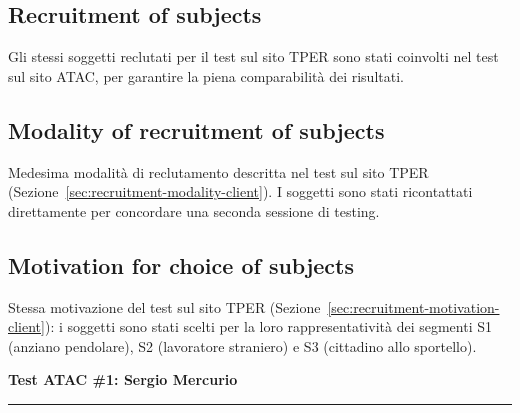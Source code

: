 ﻿\documentclass[11pt,a4paper]{article}
\begin{document}
\vspace{0.2cm}

\subsection*{Recruitment of subjects}
\begin{tcolorbox}[base]
Gli stessi soggetti reclutati per il test sul sito TPER
sono stati coinvolti nel test sul sito ATAC, per garantire
la piena comparabilità dei risultati.
\end{tcolorbox}

\vspace{0.2cm}

\subsection*{Modality of recruitment of subjects}
\begin{tcolorbox}[base]
Medesima modalità di reclutamento descritta nel test sul sito TPER
(Sezione~\ref{sec:recruitment-modality-client}). I soggetti sono
stati ricontattati direttamente per concordare una seconda sessione
di testing.
\end{tcolorbox}

\vspace{0.2cm}

\subsection*{Motivation for choice of subjects}
\begin{tcolorbox}[base]
Stessa motivazione del test sul sito TPER
(Sezione~\ref{sec:recruitment-motivation-client}): i soggetti
sono stati scelti per la loro rappresentatività dei segmenti
S1 (anziano pendolare), S2 (lavoratore straniero) e S3
(cittadino allo sportello).
\end{tcolorbox}


\newpage
\begin{center}
  {\color{secondaryColor}\large\bfseries
  Test ATAC \#1: Sergio Mercurio}\\
  \vspace{0.1cm}
  \color{borderColor}\hrule
\end{center}

\vspace{0.5cm}
\end{document}
